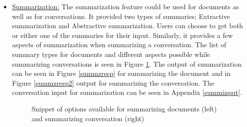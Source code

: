 \begin{itemize}
    \item \uline{Summarization:} The summarization feature could be used for documents as well as for conversations. It provided two types of summaries; Extractive summarization and Abstractive summarization. Users can choose to get both or either one of the summaries for their input. Similarly, it provides a few aspects of summarization when summarizing a conversation. The list of summary types for documents and different aspects possible while summarizing conversations is seen in Figure \ref{summzaspect}. The output of summarization can be seen in Figure \ref{summzresp} for summarizing the document and in Figure \ref{summzresp2} output for summarizing the conversation. The conversation input for summarization can be seen in Appendix \ref{summinput}.
    \begin {figure}[h!h]
        \centering
        \caption{Snippet of options available for summarizing documents (left) and summarizing conversation (right)}
        \label{summzaspect}
    \end {figure}
    \begin {figure}[h!h]
        \centering

\end{figure}
\end{itemize}
